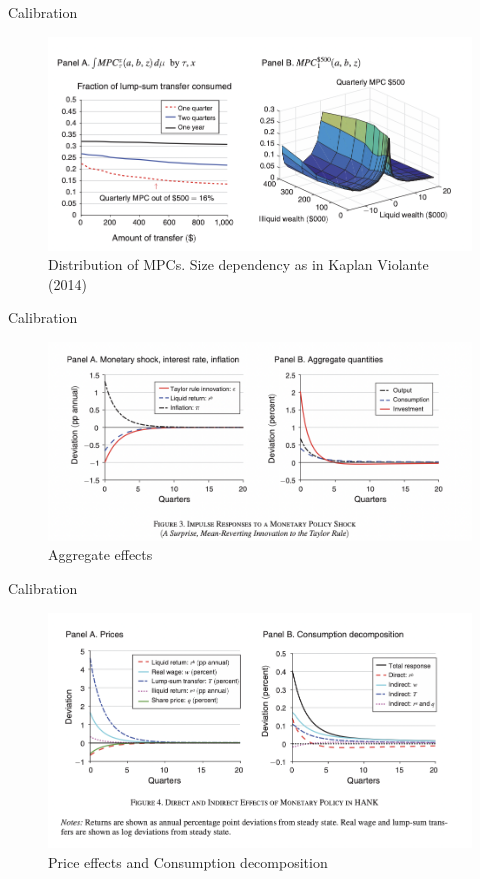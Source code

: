 \documentclass[english,xcolor=svgnames]{beamer}
\begin{document}
\begin{frame}{Calibration}
\begin{figure}
\includegraphics[scale=0.35]{figures/kmv_4}\\
Distribution of MPCs. Size dependency as in Kaplan Violante (2014)
\end{figure}
\end{frame}


\begin{frame}{Calibration}
\begin{figure}
\includegraphics[scale=0.35]{figures/kmv_5}\\
Aggregate effects
\end{figure}
\end{frame}


\begin{frame}{Calibration}
\begin{figure}
\includegraphics[scale=0.35]{figures/kmv_6}\\
Price effects and Consumption decomposition
\end{figure}
\end{frame}
\end{document}
